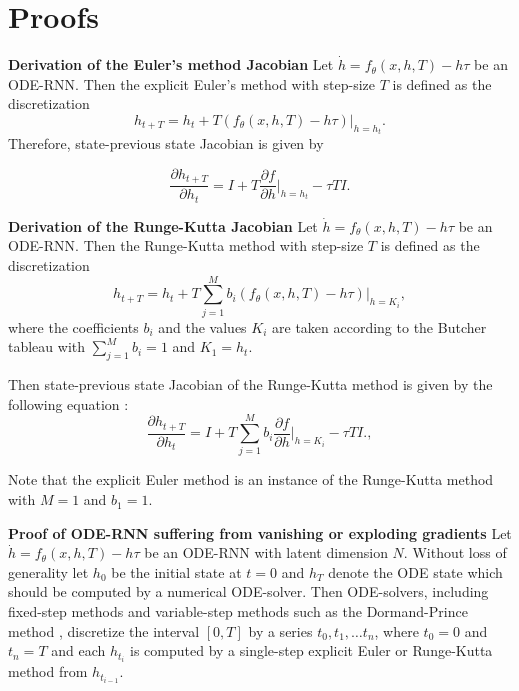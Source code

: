 \documentclass{article}
\newcommand{\beginsupplement}{\setcounter{table}{0}
\renewcommand{\thetable}{S\arabic{table}}\setcounter{algorithm}{0}
\renewcommand{\thealgorithm}{S\arabic{algorithm}}\setcounter{equation}{0}
\renewcommand{\theequation}{S\arabic{equation}}\setcounter{figure}{0}
\renewcommand{\thefigure}{S\arabic{figure}}\setcounter{section}{0}
        \renewcommand{\thesection}{S\arabic{section}}}
\begin{document}
\clearpage

\beginsupplement


\section{Proofs}
\textbf{Derivation of the Euler's method Jacobian}
Let $\dot{h} = f_\theta(x,h,T) - h \tau$ be an ODE-RNN. 
Then the explicit Euler's method with step-size $T$ is defined as the discretization 
\begin{equation}
h_{t+T} = h_t + T (f_\theta(x,h,T)-h\tau)\Big|_{h=h_t}.
\end{equation}
Therefore, state-previous state Jacobian is given by

    \begin{equation}
         \frac{\partial h_{t+T}}{\partial h_t} = I + T\frac{\partial f}{\partial h}\Big|_{h=h_t} - \tau T I.
    \end{equation}

\textbf{Derivation of the Runge-Kutta Jacobian}
Let $\dot{h} = f_\theta(x,h,T) - h \tau$ be an ODE-RNN. 
Then the Runge-Kutta method with step-size $T$ is defined as the discretization 
\begin{equation}
h_{t+T} = h_t + T \sum_{j=1}^{M} b_i (f_\theta(x,h,T)-h\tau)\Big|_{h=K_i},
\end{equation}
where the coefficients $b_i$ and the values $K_i$ are taken according to the Butcher tableau with $\sum_{j=1}^{M} b_i=1$ and $K_1=h_t$.

Then state-previous state Jacobian of the Runge-Kutta method  is given by the following equation :
    \begin{equation}
          \frac{\partial h_{t+T}}{\partial h_t} = I + T\sum_{j=1}^{M} b_i \frac{\partial f}{\partial h}\Big|_{h=K_i} - \tau T I.,
    \end{equation}

Note that the explicit Euler method is an instance of the Runge-Kutta method with $M=1$ and $b_1=1$.

\textbf{Proof of ODE-RNN suffering from vanishing or exploding gradients}
Let $\dot{h} = f_\theta(x,h,T) - h \tau$ be an ODE-RNN with latent dimension $N$. Without loss of generality let $h_0$ be the initial state at $t=0$ and $h_T$ denote the ODE state which should be computed by a numerical ODE-solver.
Then ODE-solvers, including fixed-step methods \cite{runge1895numerische} and variable-step methods such as the Dormand-Prince method \cite{dormand1980family}, discretize the interval $[0,T]$ by a series $t_0,t_1,\dots t_n$, where $t_0=0$ and $t_n=T$ and each $h_{t_i}$ is computed by a single-step explicit Euler or Runge-Kutta method from $h_{t_{i-1}}$. 
\end{document}
